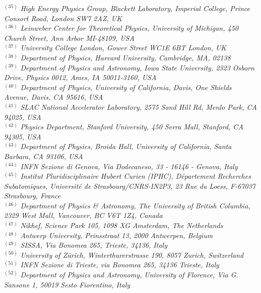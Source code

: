 {\begin{center}
$^{(35)}$ \emph{High Energy Physics Group, Blackett Laboratory, Imperial College, Prince Consort Road, London SW7 2AZ, UK}\\
$^{(36)}$ \emph{Leinweber Center for Theoretical Physics, University of Michigan, 450 Church Street, Ann Arbor MI-48109, USA}\\
$^{(37)}$ \emph{University College London, Gower Street WC1E 6BT London, UK}\\
$^{(38)}$ \emph{Department of Physics, Harvard University, Cambridge, MA, 02138}\\
$^{(39)}$ \emph{Department of Physics and Astronomy, Iowa State University, 2323 Osborn Drive, Physics 0012, Ames, IA 50011-3160, USA}\\
$^{(40)}$ \emph{Department of Physics, University of California, Davis, One Shields Avenue, Davis, CA 95616, USA}\\
$^{(41)}$ \emph{SLAC National Accelerator Laboratory, 2575 Sand Hill Rd, Menlo Park, CA 94025, USA}\\
$^{(42)}$ \emph{Physics Department, Stanford University, 450 Serra Mall, Stanford, CA 94305, USA}\\
$^{(43)}$ \emph{Department of Physics, Broida Hall, University of California, Santa Barbara, CA 93106, USA}\\
$^{(44)}$ \emph{INFN Sezione di Genova, Via Dodecaneso, 33 - 16146 - Genova, Italy}\\
$^{(45)}$ \emph{Institut Pluridisciplinaire Hubert Curien (IPHC), D\'epartement Recherches Subatomiques, Universit\'e de Strasbourg/CNRS-IN2P3, 23 Rue du Loess, F-67037 Strasbourg, France}\\
$^{(46)}$ \emph{Department of Physics \& Astronomy, The University of British Columbia, 2329 West Mall, Vancouver, BC V6T 1Z4, Canada}\\
$^{(47)}$ \emph{Nikhef, Science Park 105, 1098 XG Amsterdam, The Netherlands}\\
$^{(48)}$ \emph{Antwerp University, Prinsstraat 13, 2000 Antwerpen, Belgium}\\
$^{(49)}$ \emph{SISSA, Via Bonomea 265, Trieste, 34136, Italy}\\
$^{(50)}$ \emph{University of Z\"urich, Winterthurerstrasse 190, 8057 Zurich, Switzerland}\\
$^{(51)}$ \emph{INFN Sezione di Trieste, via Bonomea 265, 34136 Trieste, Italy}\\
$^{(52)}$ \emph{Department of Physics and Astronomy, University of Florence, Via G. Sansone 1, 50019 Sesto Fiorentino, Italy}\\

\end{center}}
